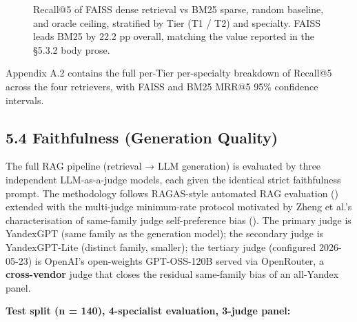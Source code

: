 \documentclass[
  american,
  a4paper,
]{article}
\makeatletter
\newcommand*\pandocbounded[1]{%
  \sbox\pandoc@box{#1}%
  \Gscale@div\@tempa{\textheight}{\dimexpr\ht\pandoc@box+\dp\pandoc@box\relax}%
  \Gscale@div\@tempb{\linewidth}{\wd\pandoc@box}%
  \ifdim\@tempb\p@<\@tempa\p@\let\@tempa\@tempb\fi%
  \ifdim\@tempa\p@<\p@\scalebox{\@tempa}{\usebox\pandoc@box}%
  \else\usebox{\pandoc@box}%
  \fi%
}
\makeatother
\begin{document}
\begin{figure}
\centering
\pandocbounded{}
\caption{Recall@5 of FAISS dense retrieval vs BM25 sparse, random
baseline, and oracle ceiling, stratified by Tier (T1 / T2) and
specialty. FAISS leads BM25 by 22.2 pp overall, matching the value
reported in the §5.3.2 body prose.}
\end{figure}

Appendix A.2 contains the full per-Tier per-specialty breakdown of
Recall@5 across the four retrievers, with FAISS and BM25 MRR@5 95\%
confidence intervals.

\subsection{5.4 Faithfulness (Generation
Quality)}\label{faithfulness-generation-quality}

The full RAG pipeline (retrieval → LLM generation) is evaluated by three
independent LLM-as-a-judge models, each given the identical strict
faithfulness prompt. The methodology follows RAGAS-style automated RAG
evaluation () extended with
the multi-judge minimum-rate protocol motivated by Zheng et al.'s
characterisation of same-family judge self-preference bias
(). The primary judge
is YandexGPT (same family as the generation model); the secondary judge
is YandexGPT-Lite (distinct family, smaller); the tertiary judge
(configured 2026-05-23) is OpenAI's open-weights GPT-OSS-120B served via
OpenRouter, a \textbf{cross-vendor} judge that closes the residual
same-family bias of an all-Yandex panel.

\textbf{Test split (n = 140), 4-specialist evaluation, 3-judge panel:}
\end{document}
